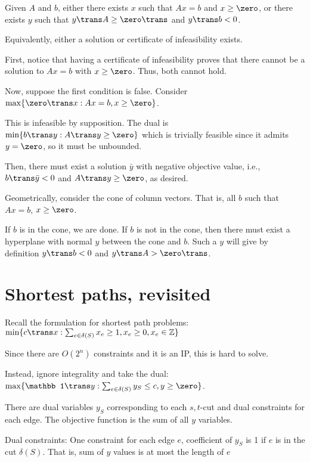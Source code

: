 \begin{lemma}
  Given $A$ and $b$, either there exists $x$
  such that $Ax = b$ and $x \geq \zero$,
  or there exists $y$ such that $y\trans A \geq \zero\trans$ and $y\trans b < 0$.

  Equivalently, either a solution or certificate of infeasibility exists.
\end{lemma}
\begin{prf}
  First, notice that having a certificate of
  infeasibility proves that there cannot be a solution to $Ax = b$
  with $x \geq \zero$. Thus, both cannot hold.

  Now, suppose the first condition is false.
  Consider $\max\{\zero\trans x : Ax = b, x \geq \zero\}$.

  This is infeasible by supposition.
  The dual is $\min\{b\trans y : A\trans y \geq \zero\}$
  which is trivially feasible since it admits $y = \zero$, so it
  must be unbounded.

  Then, there must exist a solution $\bar y$ with negative objective value,
  i.e., $b\trans \bar y < 0$ and $A\trans y \geq \zero$, as desired.
\end{prf}

Geometrically, consider the cone of column vectors.
That is, all $b$ such that $Ax = b$, $x \geq \zero$.

If $b$ is in the cone, we are done.
If $b$ is not in the cone, then there must exist a hyperplane with normal $y$
between the cone and $b$.
Such a $y$ will give by definition $y\trans b < 0$ and $y\trans A > \zero\trans$.

\section{Shortest paths, revisited}

Recall the formulation for shortest path problems:
$\min\{c\trans x : \sum_{e \in \delta(S)}x_e \geq 1, x_e \geq 0, x_e \in \Z\}$

Since there are $O(2^n)$ constraints and it is an IP, this is hard to solve.

Instead, ignore integrality and take the dual:
$\max\{\mathbb1\trans y : \sum_{e \in \delta(S)}y_S \leq c, y \geq \zero\}$.

There are dual variables $y_S$ corresponding to each $s,t$-cut
and dual constraints for each edge.
The objective function is the sum of all $y$ variables.

Dual constraints: One constraint for each edge $e$, coefficient
of $y_S$ is 1 if $e$ is in the cut $\delta(S)$. That is, sum
of $y$ values is at most the length of $e$

